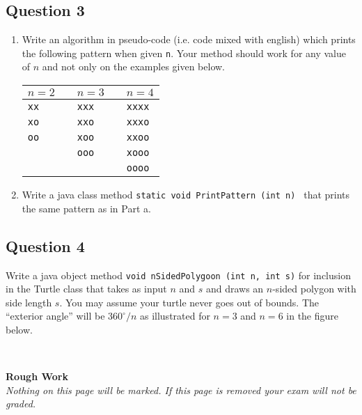 \documentclass[12pt]{report}
\newcommand{\AnsBox}[1]{
\hspace{-1cm}\fbox{
\begin{minipage}[b][#1][c]{17.6cm}
\hfill
\end{minipage}}
}
\begin{document}
\subsection*{Question 3}
\begin{enumerate}
\item Write an algorithm in pseudo-code (i.e. code mixed with english) which prints the following pattern when given \texttt{n}. Your method should work for any value of $n$ and not only on the examples given below.

\begin{center}
\begin{tabular}{l  c l c l }
$n=2$ 		&\hspace{50px}\hfill	& $n=3$ 		&\hspace{50px}\hfill& $n=4$ \\
\hline
\texttt{xx}		&&\texttt{xxx}	&& \texttt{xxxx} \\
\texttt{xo}		&&\texttt{xxo}	&& \texttt{xxxo} \\
\texttt{oo}		&&\texttt{xoo}	&& \texttt{xxoo} \\
			&&\texttt{ooo}	&& \texttt{xooo} \\
			&&			&& \texttt{oooo} \\
\hline
\end{tabular}
\end{center}

\AnsBox{13cm}

\item Write a java class method \texttt{static void PrintPattern (int n) } that prints the same pattern as in Part a.

\AnsBox{14cm}

\end{enumerate}

\clearpage
\subsection*{Question 4}
Write a java object method \texttt{void nSidedPolygoon (int n, int s)} for inclusion in the Turtle class that takes as input $n$ and $s$ and draws an $n$-sided polygon with side length $s$. You may assume your turtle never goes out of bounds. The ``exterior angle'' will be ${360^{\circ}}/{n}$ as illustrated for $n=3$ and $n=6$ in the figure below. \\
\begin{center}
\\
\end{center}

\AnsBox{14cm}

\clearpage
\begin{center}
\textbf{Rough Work}\\
\emph{Nothing on this page will be marked. If this page is removed your exam will not be graded.}
\end{center}
\end{document}
